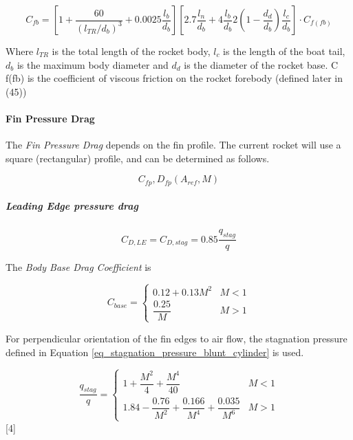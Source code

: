 \documentclass[]{article}
\let\oldparagraph\paragraph
\renewcommand{\paragraph}[1]{\oldparagraph{#1}\mbox{}}
\let\oldsubparagraph\subparagraph
\renewcommand{\subparagraph}[1]{\oldsubparagraph{#1}\mbox{}}
\begin{document}
\begin{equation}
\label{body_drag_coefficient}
C_{fb} = \left[ 1 + \dfrac{60}{(l_{TR}/d_b)^3} + 0.0025 \dfrac{l_b}{d_b} \right] \left[ 2.7 \dfrac{l_n}{d_b} + 4 \dfrac{l_b}{d_b} 2 \left( 1 - \dfrac{d_d}{d_b} \right) \dfrac{l_c}{d_b} \right] \cdot C_{f(fb)}
\end{equation}

Where \(l_{TR}\) is the total length of the rocket body, \(l_c\) is the
length of the boat tail, \(d_b\) is the maximum body diameter and
\(d_d\) is the diameter of the rocket base. C f(fb) is the coefficient
of viscous friction on the rocket forebody (defined later in (45))

\paragraph{Fin Pressure Drag}\label{fin-pressure-drag}

The \emph{Fin Pressure Drag} depends on the fin profile. The current
rocket will use a square (rectangular) profile, and can be determined as
follows.

\begin{equation}
C_{fp}, D_{fp} (A_{ref}, M) 
\end{equation}

\subparagraph{Leading Edge pressure
drag}\label{leading-edge-pressure-drag}

\begin{equation}
    C_{D,LE} = C_{D,stag} = 0.85 \dfrac{q_{stag}}{q}
\end{equation}

The \emph{Body Base Drag Coefficient} is

\begin{equation}
C_{base} =
\begin{cases}
    0.12 + 0.13 M^2     &   M < 1 \\
    \dfrac{0.25}{M}     &   M > 1
\end{cases}
\end{equation}

For perpendicular orientation of the fin edges to air flow, the
stagnation pressure defined in Equation
\ref{eq_stagnation_pressure_blunt_cylinder} is used.

\[
\dfrac{q_{stag}}{q} =  
\begin{cases}
    1 + \dfrac{M^2}{4} + \dfrac{M^4}{40}                                    & M < 1 \\
    1.84 - \dfrac{0.76}{M^2} + \dfrac{0.166}{M^4} + \dfrac{0.035}{M^6}      & M > 1
\end{cases}
\] {[}4{]}
\end{document}
